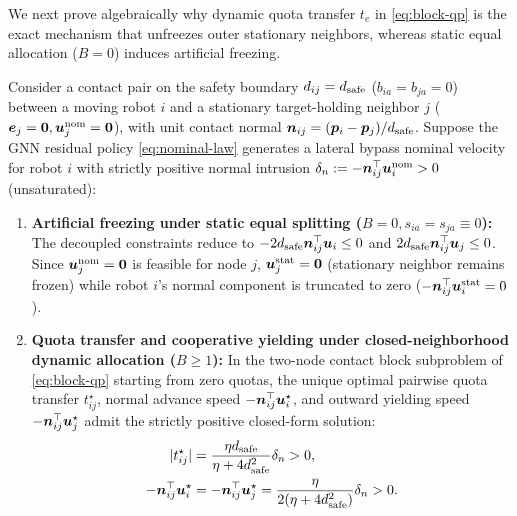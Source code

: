 We next prove algebraically why dynamic quota transfer $t_e$ in \eqref{eq:block-qp} is the exact mechanism that unfreezes outer stationary neighbors, whereas static equal allocation ($B=0$) induces artificial freezing.

\begin{proposition}\label{prop:unfreeze}
Consider a contact pair on the safety boundary $d_{ij}=d_{\mathrm{safe}}$ ($b_{ia}=b_{ja}=0$) between a moving robot $i$ and a stationary target-holding neighbor $j$ ($\boldsymbol{e}_j=\boldsymbol 0,\boldsymbol{u}_j^{\mathrm{nom}}=\boldsymbol 0$), with unit contact normal $\boldsymbol n_{ij}=(\boldsymbol{p}_i-\boldsymbol{p}_j)/d_{\mathrm{safe}}$. Suppose the GNN residual policy \eqref{eq:nominal-law} generates a lateral bypass nominal velocity for robot $i$ with strictly positive normal intrusion $\delta_n:=-\boldsymbol n_{ij}^{\top}\boldsymbol{u}_i^{\mathrm{nom}}>0$ (unsaturated):
\begin{enumerate}
 \item \textbf{Artificial freezing under static equal splitting ($B=0,s_{ia}=s_{ja}\equiv 0$):} The decoupled constraints reduce to $-2d_{\mathrm{safe}}\boldsymbol n_{ij}^{\top}\boldsymbol{u}_i\le 0$ and $2d_{\mathrm{safe}}\boldsymbol n_{ij}^{\top}\boldsymbol{u}_j\le 0$. Since $\boldsymbol{u}_j^{\mathrm{nom}}=\boldsymbol 0$ is feasible for node $j$, $\boldsymbol{u}_j^{\mathrm{stat}}=\boldsymbol 0$ (stationary neighbor remains frozen) while robot $i$'s normal component is truncated to zero ($-\boldsymbol n_{ij}^{\top}\boldsymbol{u}_i^{\mathrm{stat}}=0$).
 \item \textbf{Quota transfer and cooperative yielding under closed-neighborhood dynamic allocation ($B\ge 1$):} In the two-node contact block subproblem of \eqref{eq:block-qp} starting from zero quotas, the unique optimal pairwise quota transfer $t_{ij}^\star$, normal advance speed $-\boldsymbol n_{ij}^{\top}\boldsymbol{u}_i^\star$, and outward yielding speed $-\boldsymbol n_{ij}^{\top}\boldsymbol{u}_j^\star$ admit the strictly positive closed-form solution:
 \begin{equation}
 \begin{split}
  |t_{ij}^\star| &= \frac{\eta d_{\mathrm{safe}}}{\eta+4d_{\mathrm{safe}}^2}\delta_n > 0,\\
  -\boldsymbol n_{ij}^{\top}\boldsymbol{u}_i^\star &= -\boldsymbol n_{ij}^{\top}\boldsymbol{u}_j^\star = \frac{\eta}{2(\eta+4d_{\mathrm{safe}}^2)}\delta_n > 0.
 \end{split}\label{eq:joint-yield}
 \end{equation}
\end{enumerate}
\end{proposition}
